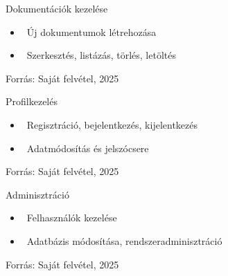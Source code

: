 \documentclass[aspectratio=169, 11pt]{beamer}
\begin{document}
\begin{frame}{Dokumentációk kezelése}
    \begin{center}
    \end{center}
    \begin{itemize}
      \item \faFileMedical~Új dokumentumok létrehozása
      \item \faEdit~Szerkesztés, listázás, törlés, letöltés
    \end{itemize}
    \begin{center}
        \scriptsize Forrás: Saját felvétel, 2025
    \end{center}
\end{frame}

\begin{frame}{Profilkezelés}
    \begin{center}
    \end{center}
    \begin{itemize}
      \item \faDoorOpen~Regisztráció, bejelentkezés, kijelentkezés
      \item \faUserEdit~Adatmódosítás és jelszócsere
    \end{itemize}
      \begin{center}
        \scriptsize Forrás: Saját felvétel, 2025
      \end{center}
\end{frame}

\begin{frame}{Adminisztráció}
    \begin{center}
    \end{center}
    \begin{itemize}
      \item \faUserCog~Felhasználók kezelése
      \item \faCogs~Adatbázis módosítása, rendszeradminisztráció
    \end{itemize}
  \begin{center}
    \scriptsize Forrás: Saját felvétel, 2025
  \end{center}
\end{frame}
\end{document}
